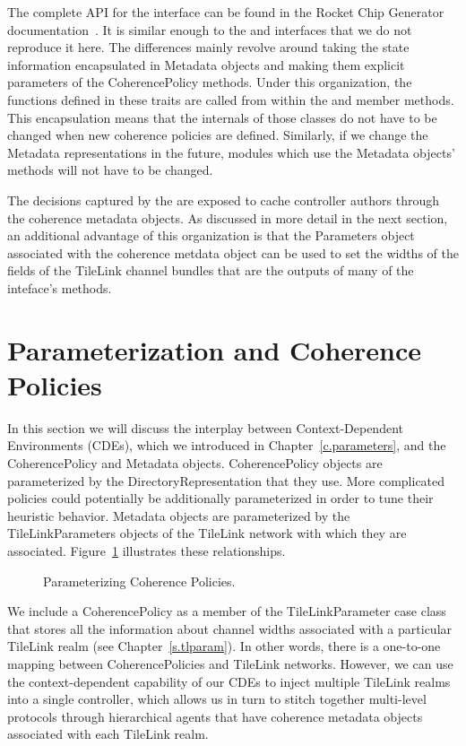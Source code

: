 The complete API for the  interface can be found in the
Rocket Chip Generator documentation~\cite{rocket}.
It is similar enough to the  and  interfaces that
we do not reproduce it here.
The differences mainly revolve around taking the state information encapsulated
in Metadata objects and making them explicit parameters of the CoherencePolicy methods.
Under this organization, the functions defined in these traits
are called from within the  and  member methods.
This encapsulation means that the internals of those classes do not have to be changed
when new coherence policies are defined.
Similarly, if we change the Metadata representations in the future,
modules which use the Metadata objects' methods will not have to be changed.

The decisions captured by the  are exposed to cache controller authors through
the coherence metadata objects.
As discussed in more detail in the next section,
an additional advantage of this organization is that the Parameters object
associated with the coherence metdata object can be used to set the widths of the fields of the
TileLink channel bundles that are the outputs of many of the inteface's methods.

\section{Parameterization and Coherence Policies}

In this section we will discuss the interplay between Context-Dependent Environments (CDEs),
which we introduced in Chapter~\ref{c.parameters},
and the CoherencePolicy and Metadata objects.
CoherencePolicy objects are parameterized by the DirectoryRepresentation that they use.
More complicated policies could potentially be additionally parameterized in order to tune their heuristic behavior.
Metadata objects are parameterized by the TileLinkParameters objects of the TileLink network with which they are associated.
Figure~\ref{fig:cdepolicy} illustrates these relationships.

\begin{figure}[t!]
\centering
\caption[Parameterizing Coherence Policies.]{
Parameterizing Coherence Policies.
}
\label{fig:cdepolicy}
\end{figure}

We include a CoherencePolicy as a member of the TileLinkParameter case class that stores all the information
about channel widths associated with a particular TileLink realm (see Chapter~\ref{s.tlparam}).
In other words, there is a one-to-one mapping between CoherencePolicies and TileLink networks.
However, we can use the context-dependent capability of our CDEs to 
inject multiple TileLink realms into a single controller,
which allows us in turn to stitch together multi-level protocols through hierarchical agents
that have coherence metadata objects associated with each TileLink realm.

